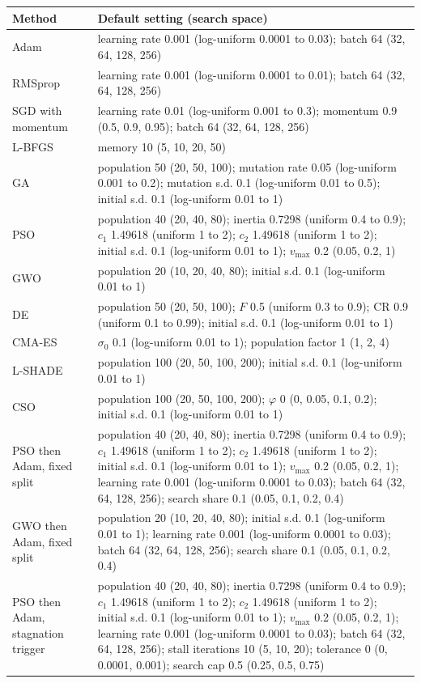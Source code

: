 \begin{tabular}{>{\raggedright\arraybackslash}p{}>{\raggedright\arraybackslash}p{}}
\toprule
Method & Default setting (search space) \\
\midrule
Adam & learning rate 0.001 (log-uniform 0.0001 to 0.03); batch 64 (32, 64, 128, 256) \\
RMSprop & learning rate 0.001 (log-uniform 0.0001 to 0.01); batch 64 (32, 64, 128, 256) \\
SGD with momentum & learning rate 0.01 (log-uniform 0.001 to 0.3); momentum 0.9 (0.5, 0.9, 0.95); batch 64 (32, 64, 128, 256) \\
L-BFGS & memory 10 (5, 10, 20, 50) \\
GA & population 50 (20, 50, 100); mutation rate 0.05 (log-uniform 0.001 to 0.2); mutation s.d. 0.1 (log-uniform 0.01 to 0.5); initial s.d. 0.1 (log-uniform 0.01 to 1) \\
PSO & population 40 (20, 40, 80); inertia 0.7298 (uniform 0.4 to 0.9); $c_1$ 1.49618 (uniform 1 to 2); $c_2$ 1.49618 (uniform 1 to 2); initial s.d. 0.1 (log-uniform 0.01 to 1); $v_{\max}$ 0.2 (0.05, 0.2, 1) \\
GWO & population 20 (10, 20, 40, 80); initial s.d. 0.1 (log-uniform 0.01 to 1) \\
DE & population 50 (20, 50, 100); $F$ 0.5 (uniform 0.3 to 0.9); CR 0.9 (uniform 0.1 to 0.99); initial s.d. 0.1 (log-uniform 0.01 to 1) \\
CMA-ES & $\sigma_0$ 0.1 (log-uniform 0.01 to 1); population factor 1 (1, 2, 4) \\
L-SHADE & population 100 (20, 50, 100, 200); initial s.d. 0.1 (log-uniform 0.01 to 1) \\
CSO & population 100 (20, 50, 100, 200); $\varphi$ 0 (0, 0.05, 0.1, 0.2); initial s.d. 0.1 (log-uniform 0.01 to 1) \\
PSO then Adam, fixed split & population 40 (20, 40, 80); inertia 0.7298 (uniform 0.4 to 0.9); $c_1$ 1.49618 (uniform 1 to 2); $c_2$ 1.49618 (uniform 1 to 2); initial s.d. 0.1 (log-uniform 0.01 to 1); $v_{\max}$ 0.2 (0.05, 0.2, 1); learning rate 0.001 (log-uniform 0.0001 to 0.03); batch 64 (32, 64, 128, 256); search share 0.1 (0.05, 0.1, 0.2, 0.4) \\
GWO then Adam, fixed split & population 20 (10, 20, 40, 80); initial s.d. 0.1 (log-uniform 0.01 to 1); learning rate 0.001 (log-uniform 0.0001 to 0.03); batch 64 (32, 64, 128, 256); search share 0.1 (0.05, 0.1, 0.2, 0.4) \\
PSO then Adam, stagnation trigger & population 40 (20, 40, 80); inertia 0.7298 (uniform 0.4 to 0.9); $c_1$ 1.49618 (uniform 1 to 2); $c_2$ 1.49618 (uniform 1 to 2); initial s.d. 0.1 (log-uniform 0.01 to 1); $v_{\max}$ 0.2 (0.05, 0.2, 1); learning rate 0.001 (log-uniform 0.0001 to 0.03); batch 64 (32, 64, 128, 256); stall iterations 10 (5, 10, 20); tolerance 0 (0, 0.0001, 0.001); search cap 0.5 (0.25, 0.5, 0.75) \\

\end{tabular}
